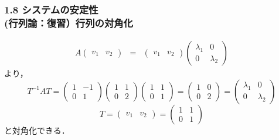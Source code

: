 \begin{frame}[t]
\frametitle{1.8 システムの安定性 \\
 (行列論：復習）行列の対角化}
\addtocounter{equation}{-1}
\begin{eqnarray}
 A
 \left(
 \begin{array}{cc}
  v_1 & v_2
 \end{array}
 \right)
 &= &
 \left(
 \begin{array}{cc}
  v_1 & v_2
 \end{array}
 \right)
 \left(
 \begin{array}{cc}
  \lambda_1 & 0 \\
  0 & \lambda_2
 \end{array}
 \right)
\end{eqnarray}
より，
\begin{equation}
 T^{-1}AT =
 \left(
 \begin{array}{cc}
  1 & -1 \\
  0 & 1
 \end{array}
 \right)
 \left(
 \begin{array}{cc}
  1 & 1 \\
  0 & 2
 \end{array}
 \right)
 \left(
 \begin{array}{cc}
  1 & 1 \\
  0 & 1
 \end{array}
 \right) =
 \left(
 \begin{array}{cc}
  1 & 0 \\
  0 & 2
 \end{array}
 \right) =
 \left(
 \begin{array}{cc}
  \lambda_1 & 0 \\
  0 & \lambda_2
 \end{array}
 \right)
\end{equation}
\begin{equation}
  T = 
 \left(
 \begin{array}{cc}
  v_1 & v_2
 \end{array}
 \right)
 =
 \left(
 \begin{array}{cc}
  1 & 1 \\
  0 & 1
 \end{array}
 \right)
\end{equation}
と対角化できる．
\end{frame}


